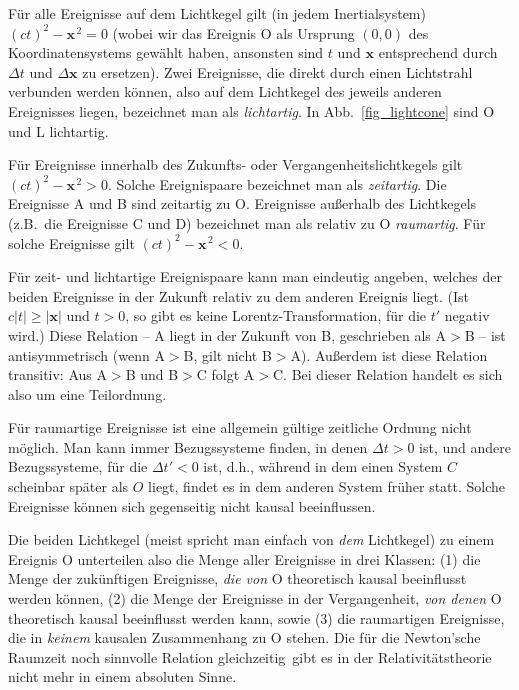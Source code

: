 F\"ur alle Ereignisse auf dem Lichtkegel
gilt (in jedem Inertialsystem)
$(ct)^2 - \pmb{x}^{\,2}=0$ (wobei wir
das Ereignis O als Ursprung $(0,0)$
des Koordinatensystems gew\"ahlt
haben, ansonsten sind $t$ und
$\pmb{x}$ entsprechend durch
$\Delta t$ und $\Delta \pmb{x}$ zu
ersetzen). Zwei Ereignisse, die direkt
durch einen Lichtstrahl verbunden
werden k\"onnen, also auf
dem Lichtkegel des jeweils anderen
Ereignisses liegen, bezeichnet man als
{\em lichtartig}. In Abb.\ \ref{fig_lightcone}
sind O und L lichtartig. 

F\"ur Ereignisse innerhalb des
Zukunfts- oder Vergangenheitslichtkegels 
gilt $(ct)^2 - \pmb{x}^{\,2}>0$. Solche
Ereignispaare bezeichnet man als
{\em zeitartig}. Die Ereignisse A und
B sind zeitartig zu O. Ereignisse
au\ss erhalb des Lichtkegels (z.B.\
die Ereignisse C und D) bezeichnet
man als relativ zu O {\em raumartig}. 
F\"ur solche Ereignisse gilt
$(ct)^2 - \pmb{x}^{\,2} <0$. 

F\"ur zeit- und lichtartige Ereignispaare
kann man eindeutig angeben, welches
der beiden Ereignisse in der Zukunft
relativ zu dem anderen Ereignis liegt.
(Ist $c|t| \geq |\pmb{x}|$ und $t>0$, so
gibt es keine Lorentz-Transformation,
f\"ur die $t'$ negativ wird.)
Diese Relation -- \glqq A liegt in der Zukunft von
B\grqq, geschrieben als A$>$B -- 
ist antisymmetrisch (wenn A$>$B,
gilt nicht B$>$A). Au\ss erdem ist
diese Relation transitiv: Aus A$>$B
und B$>$C folgt A$>$C. Bei dieser
Relation handelt es sich also um 
eine Teilordnung. 

F\"ur raumartige Ereignisse ist
eine allgemein g\"ultige zeitliche Ordnung 
nicht m\"oglich. Man kann immer
Bezugssysteme finden, in denen
$\Delta t>0$ ist, und andere Bezugssysteme, f\"ur die $\Delta t'< 0$ ist,
d.h., w\"ahrend in dem einen System
$C$ scheinbar sp\"ater als $O$ liegt,
findet es in dem anderen System 
fr\"uher statt. Solche Ereignisse
k\"onnen sich gegenseitig nicht
kausal beeinflussen. 

Die beiden Lichtkegel (meist spricht
man einfach von {\em dem} Lichtkegel)
zu einem
Ereignis O unterteilen also die Menge
aller Ereignisse in drei Klassen: (1) die
Menge der zuk\"unftigen Ereignisse,
{\em die von} O theoretisch kausal beeinflusst
werden k\"onnen, (2) die Menge der
Ereignisse in der Vergangenheit, {\em von
denen} O theoretisch kausal beeinflusst
werden kann, sowie (3) die raumartigen
Ereignisse, die in {\em keinem} kausalen
Zusammenhang zu O stehen. Die
f\"ur die Newton'sche Raumzeit noch
sinnvolle Relation \glqq gleichzeitig\grqq\ gibt
es in der Relativit\"atstheorie nicht mehr
in einem absoluten Sinne.

